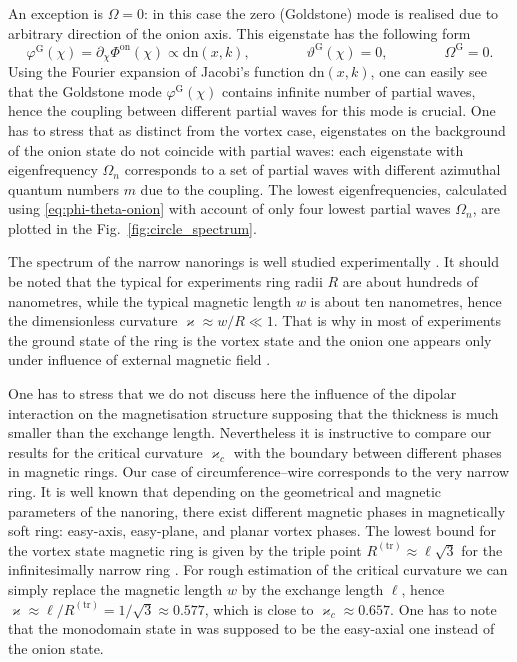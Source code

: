 \documentclass[showpacs,amsmath,amssymb,aps,pra,longbibliography,
10pt,preprint,superscriptaddress,showkeys]{revtex4-1}
\begin{document}
An exception is $\Omega =0$: in this case the zero (Goldstone) mode is realised due to arbitrary direction of the onion axis. This eigenstate has the following form
\begin{equation} \label{eq:phi-Goldstone}
\varphi ^{\mathrm{G}}(\chi ) = \partial_\chi  \Phi ^{\mathrm{on}}(\chi ) \propto \mathrm{dn}(x,k),\qquad \qquad \vartheta ^{\mathrm{G}}(\chi )=0, \qquad \qquad \Omega ^{\mathrm{G}}=0.
\end{equation}
Using the Fourier expansion of Jacobi's function $\mathrm{dn}(x,k)$, one can easily see that the Goldstone mode $\varphi ^{\mathrm{G}}(\chi )$ contains infinite number of partial waves, hence the coupling between different partial waves for this mode is crucial. One has to stress that as distinct from the vortex case, eigenstates on the background of the onion state do not coincide with partial waves: each eigenstate with eigenfrequency $\Omega _n$ corresponds to a set of partial waves with different azimuthal quantum numbers $m$ due to the coupling. The lowest eigenfrequencies, calculated using \eqref{eq:phi-theta-onion} with account of only four lowest partial waves $\Omega _n$, are plotted in the Fig.~\ref{fig:circle_spectrum}.

The spectrum of the narrow nanorings is well studied experimentally \cite{Giesen07,Demokritov09}. It should be noted that the typical for experiments ring radii $R$ are about hundreds of nanometres, while the typical magnetic length $w$ is about ten nanometres, hence the dimensionless curvature $\varkappa \approx w/R\ll1$. That is why in most of experiments the ground state of the ring is the vortex state and the onion one appears only under influence of external magnetic field \cite{Klaui03a}.

One has to stress that we do not discuss here the influence of the dipolar interaction on the magnetisation structure supposing that the thickness is much smaller than the exchange length. Nevertheless it is instructive to compare our results for the critical curvature $\varkappa _c$ with the boundary between different phases in magnetic rings. Our case of circumference--wire corresponds to the very narrow ring. It is well known \cite{Kravchuk07} that depending on the geometrical and magnetic parameters of the nanoring, there exist different magnetic phases in magnetically soft ring: easy-axis, easy-plane, and planar vortex phases. The lowest bound for the vortex state magnetic ring is given by the triple point $R^{\mathrm{(tr)}}\approx \ell \sqrt{3}$ for the infinitesimally narrow ring  \cite{Kravchuk07}. For rough estimation of the critical curvature we can simply replace the magnetic length $w$ by the exchange length $\ell$, hence $\varkappa \approx \ell/R^{\mathrm{(tr)}} = 1/\sqrt{3}\approx0.577$, which is close to $\varkappa _c\approx 0.657$. One has to note that the monodomain state in \cite{Kravchuk07} was supposed to be the easy-axial one instead of the onion state.
\end{document}
